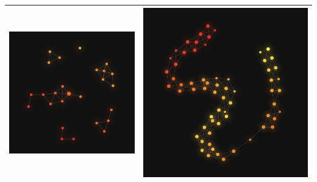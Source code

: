 \documentclass[12pt]{article}
\begin{document}
\begin{table}[H]
\begin{tabular}{|c|c|c|c|}
	\multicolumn{2}{c}{\includegraphics[scale=0.48]{figures/mydata1}} & 	\multicolumn{2}{c}{\includegraphics[scale=0.3]{figures/mydata2}}\\\hline

\end{tabular}
\end{table}
\end{document}
